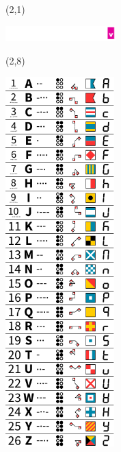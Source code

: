 \documentclass{extarticle}
\begin{document}
\pagecolor{black}
\pagestyle{empty}


\begin{textblock}{42}(2,1)
\vfill
{\centerline{\includegraphics[height=6mm]{tools/images/logo-navic-5.pdf}}} 
\vfill
\end{textblock}

\begin{textblock}{42}(2,8)
\vfill
{\centerline{\includegraphics[width=42mm]{tools/main.pdf}}} 
\vfill
\end{textblock}
\end{document}
